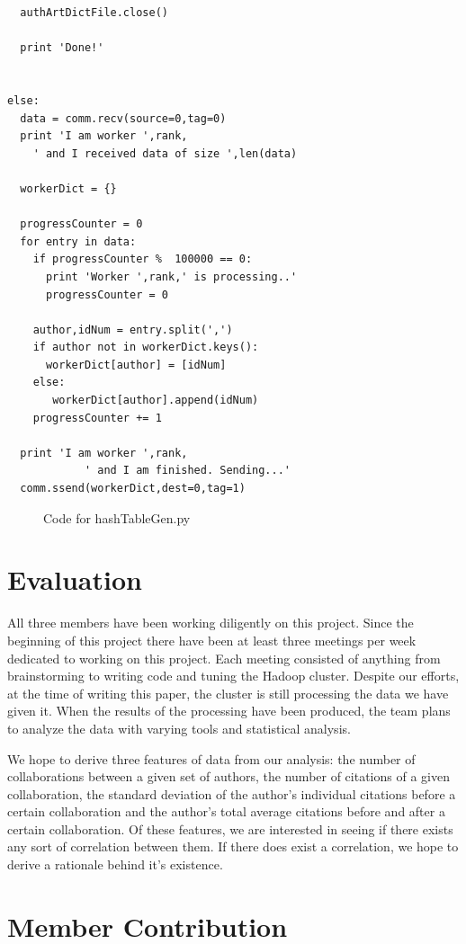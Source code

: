 \documentclass[10pt,journal,compsoc]{IEEEtran}
\begin{document}
\begin{verbatim}
  authArtDictFile.close()

  print 'Done!'


else:
  data = comm.recv(source=0,tag=0)
  print 'I am worker ',rank,
    ' and I received data of size ',len(data)

  workerDict = {}

  progressCounter = 0
  for entry in data:
    if progressCounter %  100000 == 0:
      print 'Worker ',rank,' is processing..'
      progressCounter = 0

    author,idNum = entry.split(',')
    if author not in workerDict.keys():
      workerDict[author] = [idNum]
    else:
       workerDict[author].append(idNum)
    progressCounter += 1

  print 'I am worker ',rank,
            ' and I am finished. Sending...'
  comm.ssend(workerDict,dest=0,tag=1)

\end{verbatim}
\begin{figure}[htp]
\centering
\caption{Code for hashTableGen.py}
\label{fig:}
\end{figure}

\section{Evaluation}
All three members have been working diligently on this project. Since the beginning of this project there have been at least three meetings per week dedicated to working on this project. Each meeting consisted of anything from brainstorming to writing code and tuning the Hadoop cluster. Despite our efforts, at the time of writing this paper, the cluster is still processing the data we have given it. When the results of the processing have been produced, the team plans to analyze the data with varying tools and statistical analysis. 

We hope to derive three features of data from our analysis: the number of collaborations between a given set of authors, the number of citations of a given collaboration, the standard deviation of the author's individual citations before a certain collaboration and the author's total average citations before and after a certain collaboration. Of these features, we are interested in seeing if there exists any sort of correlation between them. If there does exist a correlation, we hope to derive a rationale behind it's existence.

\section{Member Contribution}
\end{document}
